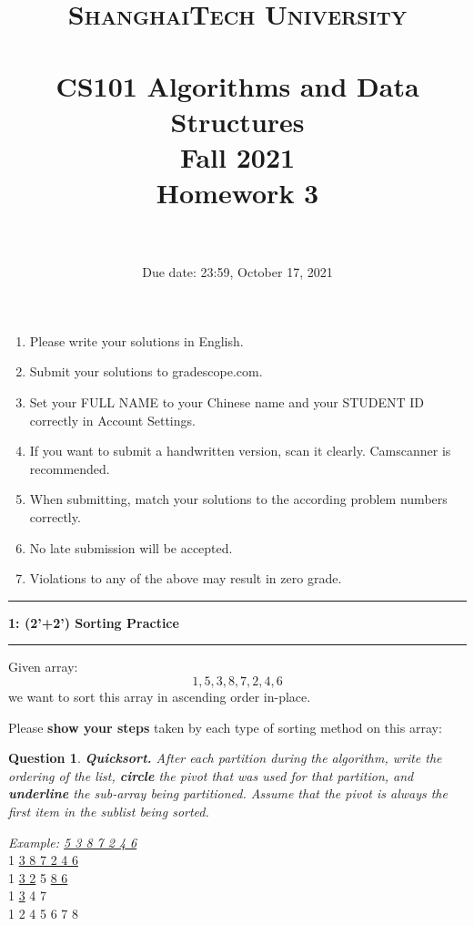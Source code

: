 \documentclass{article}
\title{
	\normalfont \normalsize
	\textsc{ShanghaiTech University} \\ [25pt]
	\horrule{0.5pt} \\[0.4cm] %
	\huge CS101 Algorithms and Data Structures\\ %
	\LARGE Fall 2021\\
	\LARGE Homework 3\\
	\horrule{2pt} \\[0.5cm] %
}
\author{}
\date{Due date: 23:59, October 17, 2021}
\newcommand\question[2]{\vspace{.25in}\hrule\textbf{#1: #2}\vspace{.5em}\hrule\vspace{.10in}}
\newtheorem{Q}{Question}
\begin{document}
\maketitle
\thispagestyle{firstpage}
\vspace{3ex}

\begin{enumerate}
	\item Please write your solutions in English.

	\item Submit your solutions to gradescope.com.

	\item Set your FULL NAME to your Chinese name and your STUDENT ID correctly in Account Settings.

	\item If you want to submit a handwritten version, scan it clearly. Camscanner is recommended.

	\item When submitting, match your solutions to the according problem numbers correctly.

	\item No late submission will be accepted.

	\item Violations to any of the above may result in zero grade.
\end{enumerate}
\newpage

\question{1}{(2'+2') Sorting Practice}
Given array:
$$1,   5,   3,   8,   7,   2,   4,   6$$
we want to sort this array in ascending order in-place.

Please \textbf{show your steps} taken by each type of sorting method on this array:
\begin{Q} \textbf{Quicksort.}
	After each partition during the algorithm, write the ordering of the list, \textbf{circle} the pivot that was used for that partition, and \textbf{underline} the sub-array being partitioned. Assume that the pivot is always the first item in the sublist being sorted.
\end{Q}
\textit{Example: \underline{ 5 3 8 7 2 4 6}}\\
1 \underline{ 3 8 7 2 4 6}\\
1 \underline{ 3 2} 5 \underline{ 8 6}\\
1 \underline{ 3} 4 \underline{} 7 \underline{}\\
1 2 \underline{} 4 5 6 7 8
\vspace{2cm}
\end{document}
